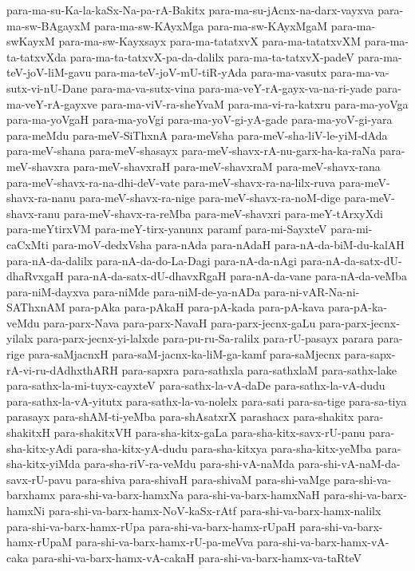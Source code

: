 {para-ma-su-Ka-la-kaSx-Na-pa-rA-Bakitx
para-ma-su-jAcnx-na-darx-vayxva
para-ma-sw-BAgayxM
para-ma-sw-KAyxMga
para-ma-sw-KAyxMgaM
para-ma-swKayxM
para-ma-sw-Kayxsayx
para-ma-tatatxvX
para-ma-tatatxvXM
para-ma-ta-tatxvXda
para-ma-ta-tatxvX-pa-da-dalilx
para-ma-ta-tatxvX-padeV
para-ma-teV-joV-liM-gavu
para-ma-teV-joV-mU-tiR-yAda
para-ma-vasutx
para-ma-va-sutx-vi-nU-Dane
para-ma-va-sutx-vina
para-ma-veY-rA-gayx-va-na-ri-yade
para-ma-veY-rA-gayxve
para-ma-viV-ra-sheYvaM
para-ma-vi-ra-katxru
para-ma-yoVga
para-ma-yoVgaH
para-ma-yoVgi
para-ma-yoV-gi-yA-gade
para-ma-yoV-gi-yara
para-meMdu
para-meV-SiThxnA
para-meVsha
para-meV-sha-liV-le-yiM-dAda
para-meV-shana
para-meV-shasayx
para-meV-shavx-rA-nu-garx-ha-ka-raNa
para-meV-shavxra
para-meV-shavxraH
para-meV-shavxraM
para-meV-shavx-rana
para-meV-shavx-ra-na-dhi-deV-vate
para-meV-shavx-ra-na-lilx-ruva
para-meV-shavx-ra-nanu
para-meV-shavx-ra-nige
para-meV-shavx-ra-noM-dige
para-meV-shavx-ranu
para-meV-shavx-ra-reMba
para-meV-shavxri
para-meY-tArxyXdi
para-meYtirxVM
para-meY-tirx-yanunx
paramf
para-mi-SayxteV
para-mi-caCxMti
para-moV-dedxVsha
para-nAda
para-nAdaH
para-nA-da-biM-du-kalAH
para-nA-da-dalilx
para-nA-da-do-La-Dagi
para-nA-da-nAgi
para-nA-da-satx-dU-dhaRvxgaH
para-nA-da-satx-dU-dhavxRgaH
para-nA-da-vane
para-nA-da-veMba
para-niM-dayxva
para-niMde
para-niM-de-ya-nADa
para-ni-vAR-Na-ni-SAThxnAM
para-pAka
para-pAkaH
para-pA-kada
para-pA-kava
para-pA-ka-veMdu
para-parx-Nava
para-parx-NavaH
para-parx-jecnx-gaLu
para-parx-jecnx-yilalx
para-parx-jecnx-yi-lalxde
para-pu-ru-Sa-ralilx
para-rU-pasayx
parara
para-rige
para-saMjacnxH
para-saM-jacnx-ka-liM-ga-kamf
para-saMjecnx
para-sapx-rA-vi-ru-dAdhxthARH
para-sapxra
para-sathxla
para-sathxlaM
para-sathx-lake
para-sathx-la-mi-tuyx-cayxteV
para-sathx-la-vA-daDe
para-sathx-la-vA-dudu
para-sathx-la-vA-yitutx
para-sathx-la-va-nolelx
para-sati
para-sa-tige
para-sa-tiya
parasayx
para-shAM-ti-yeMba
para-shAsatxrX
parashacx
para-shakitx
para-shakitxH
para-shakitxVH
para-sha-kitx-gaLa
para-sha-kitx-savx-rU-panu
para-sha-kitx-yAdi
para-sha-kitx-yA-dudu
para-sha-kitxya
para-sha-kitx-yeMba
para-sha-kitx-yiMda
para-sha-riV-ra-veMdu
para-shi-vA-naMda
para-shi-vA-naM-da-savx-rU-pavu
para-shiva
para-shivaH
para-shivaM
para-shi-vaMge
para-shi-va-barxhamx
para-shi-va-barx-hamxNa
para-shi-va-barx-hamxNaH
para-shi-va-barx-hamxNi
para-shi-va-barx-hamx-NoV-kaSx-rAtf
para-shi-va-barx-hamx-nalilx
para-shi-va-barx-hamx-rUpa
para-shi-va-barx-hamx-rUpaH
para-shi-va-barx-hamx-rUpaM
para-shi-va-barx-hamx-rU-pa-meVva
para-shi-va-barx-hamx-vA-caka
para-shi-va-barx-hamx-vA-cakaH
para-shi-va-barx-hamx-va-taRteV
}
